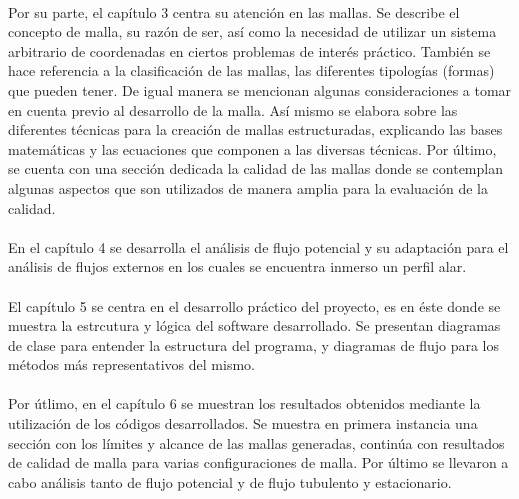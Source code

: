 \documentclass[letterpaper, openright, 12pt]{book}
\begin{document}
    \paragraph*{}
    Por su parte, el capítulo 3 centra su atención en las mallas. Se describe
    el concepto de malla, su razón de ser, así como la necesidad de utilizar un
    sistema arbitrario de coordenadas en ciertos problemas de interés práctico.
    También se hace referencia a la clasificación de las mallas, las diferentes
    tipologías (formas) que pueden tener. De igual manera se mencionan algunas
    consideraciones a tomar en cuenta previo al desarrollo de la malla. Así
    mismo se elabora sobre las diferentes técnicas para la creación de mallas
    estructuradas, explicando las bases matemáticas y las ecuaciones que
    componen a las diversas técnicas. Por último, se cuenta con una sección
    dedicada la calidad de las mallas donde se contemplan algunas aspectos que
    son utilizados de manera amplia para la evaluación de la calidad.

    \paragraph*{}
    En el capítulo 4 se desarrolla el análisis de flujo potencial y su
    adaptación para el análisis de flujos externos en los cuales se encuentra
    inmerso un perfil alar.

    \paragraph*{}
    El capítulo 5 se centra en el desarrollo práctico del proyecto, es en éste
    donde se muestra la estrcutura y lógica del software desarrollado. Se
    presentan diagramas de clase para entender la estructura del programa, y
    diagramas de flujo para los métodos más representativos del mismo.

    \paragraph*{}
    Por útlimo, en el capítulo 6 se muestran los resultados obtenidos mediante
    la utilización de los códigos desarrollados. Se muestra en primera
    instancia una sección con los límites y alcance de las mallas generadas,
    continúa con resultados de calidad de malla para varias configuraciones de
    malla. Por último se llevaron a cabo análisis tanto de flujo potencial y de
    flujo tubulento y estacionario.
\end{document}
